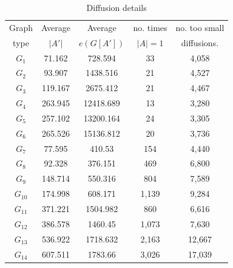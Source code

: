 \documentclass[sigconf,anonymous]{aamas}
\begin{document}
\begin{table}[hbpt]
  \caption{Diffusion details}
  \label{tab:diffusions}
  \begin{tabular}{c c c c c}\toprule
    Graph & Average & Average & no. times  & no. too small \\ 
    type &  $|A'|$ & $e(G[A'])$& $|A|=1$ & diffusions.  \\ \midrule
    $G_1$   &71.162  & 728.594 & 33 & 4,058\\
    $G_2$ 	&93.907  & 1438.516 & 21 &	4,527\\
    $G_3$	&119.167 & 2675.412 & 21 &	4,467 \\
    $G_4$   &263.945 & 12418.689 & 13 &	3,280\\
    $G_5$   &257.102 & 13200.164 & 24 &	3,305 \\
    $G_6$ 	&265.526 & 15136.812 & 20 & 3,736\\
    \midrule
    $G_7$ & 77.595 &	410.53	& 154	&4,440 \\
    $G_8$ & 92.328 &	376.151	& 469   &6,800 \\
    $G_9$ & 148.714&    550.316 & 804	&7,589 \\
    $G_{10}$ & 174.998 &	608.171	 & 1,139	 & 9,284 \\
    $G_{11}$ & 371.221 &	1504.982 &	860	 & 6,616 \\
    $G_{12}$ & 386.578 &	1460.45	& 1,073	& 7,630 \\
    $G_{13}$ & 536.922 &	1718.632&	2,163&	12,667\\
    $G_{14}$ &  607.511	& 1783.66 &	3,026	& 17,039 \\
    \bottomrule
  \end{tabular}
\end{table}
\end{document}
